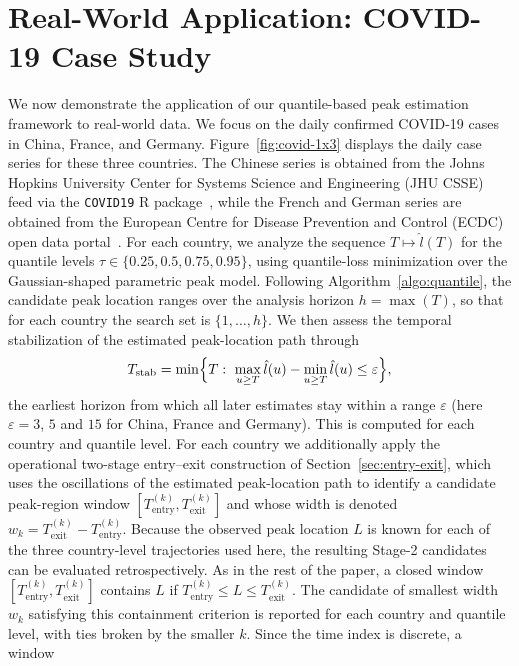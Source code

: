 \documentclass[12pt,a4paper]{article}
\begin{document}
\section{Real-World Application: COVID-19 Case Study}
\label{sec:covid-real-data}

We now demonstrate the application of our quantile-based peak estimation
framework to real-world data. We focus on the daily confirmed COVID-19
cases in China, France, and Germany. Figure~\ref{fig:covid-1x3} displays
the daily case series for these three countries. 
The Chinese series is obtained from the Johns Hopkins University Center for Systems Science and Engineering (JHU CSSE) feed via the \texttt{COVID19} R package~\citep{Guidotti2020,Guidotti2022}, while the French and German series are obtained from the European Centre for Disease Prevention and Control (ECDC) open data portal~. For each country, we
analyze the sequence $T \mapsto \hat{l}(T)$ for the quantile levels
$\tau \in \{0.25,0.5,0.75,0.95\}$, using quantile-loss minimization over
the Gaussian-shaped parametric peak model. Following Algorithm~\ref{algo:quantile}, the candidate peak location ranges over the analysis horizon
$h = \max(T)$, so that for each country the search set is
$\{1,\ldots,h\}$. 
{\color{blue}
	We then assess the temporal stabilization of the estimated
	peak-location path through
	\[
	T_{\mathrm{stab}}
	=
	\min\Bigl\{T:\ \max_{u\ge T}\hat l(u)-\min_{u\ge T}\hat l(u)\le\varepsilon\Bigr\},
	\]
	the earliest horizon from which all later estimates stay within a range
	$\varepsilon$ (here $\varepsilon=3$, $5$ and $15$ for China, France and
	Germany). This is computed for each country and quantile level.}
For each country we
additionally apply the operational two-stage entry--exit construction of
Section~\ref{sec:entry-exit}, which uses the oscillations of the
estimated peak-location path to identify a candidate peak-region window
$[T_{\mathrm{entry}}^{(k)},T_{\mathrm{exit}}^{(k)}]$ and whose width is
denoted $w_k = T_{\mathrm{exit}}^{(k)} - T_{\mathrm{entry}}^{(k)}$.
Because the observed peak location $L$ is known for each of the three
country-level trajectories used here, the resulting Stage-2 candidates
can be evaluated retrospectively.
As in the rest of the paper, a closed window
$[T_{\mathrm{entry}}^{(k)},T_{\mathrm{exit}}^{(k)}]$ contains $L$ if
\(
T_{\mathrm{entry}}^{(k)} \le L \le T_{\mathrm{exit}}^{(k)}.
\)
The candidate of smallest width $w_k$ satisfying this containment
criterion is reported for each country and quantile level, with ties
broken by the smaller $k$. Since the time index is discrete, a window
\end{document}
